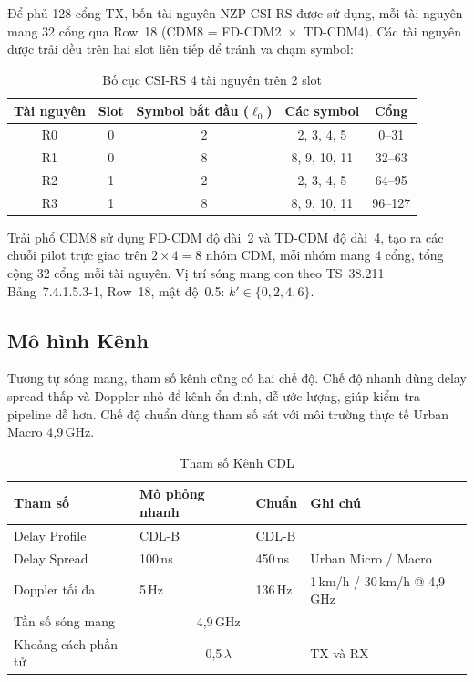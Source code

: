 \documentclass[11pt,a4paper]{article}
\begin{document}
Để phủ 128 cổng TX, bốn tài nguyên NZP-CSI-RS được sử dụng, mỗi tài nguyên mang
32 cổng qua Row~18 (CDM8 = FD-CDM2~$\times$~TD-CDM4). Các tài nguyên được
trải đều trên hai slot liên tiếp để tránh va chạm symbol:

\begin{table}[h!]
\centering
\caption{Bố cục CSI-RS 4 tài nguyên trên 2 slot}
\label{tab:csirs}
\begin{tabular}{ccccc}
\toprule
\textbf{Tài nguyên} & \textbf{Slot} & \textbf{Symbol bắt đầu ($\ell_0$)} &
\textbf{Các symbol} & \textbf{Cổng} \\
\midrule
R0 & 0 & 2 & 2, 3, 4, 5   & 0--31  \\
R1 & 0 & 8 & 8, 9, 10, 11 & 32--63 \\
R2 & 1 & 2 & 2, 3, 4, 5   & 64--95 \\
R3 & 1 & 8 & 8, 9, 10, 11 & 96--127 \\
\bottomrule
\end{tabular}
\end{table}

Trải phổ CDM8 sử dụng FD-CDM độ dài~2 và TD-CDM độ dài~4, tạo ra các chuỗi pilot
trực giao trên $2\times4 = 8$ nhóm CDM, mỗi nhóm mang 4 cổng, tổng cộng 32 cổng
mỗi tài nguyên. Vị trí sóng mang con theo TS~38.211 Bảng~7.4.1.5.3-1, Row~18,
mật độ~0.5: $k' \in \{0, 2, 4, 6\}$.

\subsection{Mô hình Kênh}

Tương tự sóng mang, tham số kênh cũng có hai chế độ. Chế độ nhanh dùng delay spread
thấp và Doppler nhỏ để kênh ổn định, dễ ước lượng, giúp kiểm tra pipeline dễ hơn.
Chế độ chuẩn dùng tham số sát với môi trường thực tế Urban Macro 4{,}9\,GHz.

\begin{table}[h!]
\centering
\caption{Tham số Kênh CDL}
\label{tab:channel}
\begin{tabular}{llll}
\toprule
\textbf{Tham số} & \textbf{Mô phỏng nhanh} & \textbf{Chuẩn} & \textbf{Ghi chú} \\
\midrule
Delay Profile        & CDL-B              & CDL-B              & \\
Delay Spread         & 100\,ns            & 450\,ns            & Urban Micro / Macro \\
Doppler tối đa       & 5\,Hz              & 136\,Hz            & 1\,km/h / 30\,km/h @ 4{,}9\,GHz \\
Tần số sóng mang     & \multicolumn{2}{c}{4{,}9\,GHz}        & \\
Khoảng cách phần tử  & \multicolumn{2}{c}{0{,}5\,$\lambda$}  & TX và RX \\
\bottomrule
\end{tabular}
\end{table}
\end{document}
